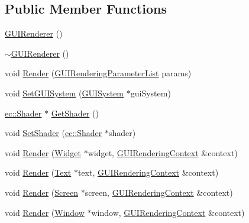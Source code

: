 \subsection*{Public Member Functions}
\begin{DoxyCompactItemize}
\item 
\mbox{\hyperlink{classngl__gui_1_1_g_u_i_renderer_ad3a022f8ea3ad488692223baf808d103}{G\+U\+I\+Renderer}} ()
\item 
\mbox{\hyperlink{classngl__gui_1_1_g_u_i_renderer_a73dd3d294eb6e79e3b874942d4a95b5a}{$\sim$\+G\+U\+I\+Renderer}} ()
\item 
void \mbox{\hyperlink{classngl__gui_1_1_g_u_i_renderer_a616aa4e5bc587896848b2523686824a7}{Render}} (\mbox{\hyperlink{structngl__gui_1_1_g_u_i_rendering_parameter_list}{G\+U\+I\+Rendering\+Parameter\+List}} params)
\item 
void \mbox{\hyperlink{classngl__gui_1_1_g_u_i_renderer_a80a4dfa6dbf0df163b24687aa1eea9f1}{Set\+G\+U\+I\+System}} (\mbox{\hyperlink{classngl__gui_1_1_g_u_i_system}{G\+U\+I\+System}} $\ast$gui\+System)
\item 
\mbox{\hyperlink{classec_1_1_shader}{ec\+::\+Shader}} $\ast$ \mbox{\hyperlink{classngl__gui_1_1_g_u_i_renderer_a7c835ff437f3781674a676aaea4546d6}{Get\+Shader}} ()
\item 
void \mbox{\hyperlink{classngl__gui_1_1_g_u_i_renderer_aa1744c6a938e609a87d55a8efece3993}{Set\+Shader}} (\mbox{\hyperlink{classec_1_1_shader}{ec\+::\+Shader}} $\ast$shader)
\item 
void \mbox{\hyperlink{classngl__gui_1_1_g_u_i_renderer_af149928da5c1cb43fb491823a1b264b8}{Render}} (\mbox{\hyperlink{classngl__gui_1_1_widget}{Widget}} $\ast$widget, \mbox{\hyperlink{classngl__gui_1_1_g_u_i_rendering_context}{G\+U\+I\+Rendering\+Context}} \&context)
\item 
void \mbox{\hyperlink{classngl__gui_1_1_g_u_i_renderer_a4c786cb952ffa1b60e47e67ace0c27db}{Render}} (\mbox{\hyperlink{classngl__gui_1_1_text}{Text}} $\ast$text, \mbox{\hyperlink{classngl__gui_1_1_g_u_i_rendering_context}{G\+U\+I\+Rendering\+Context}} \&context)
\item 
void \mbox{\hyperlink{classngl__gui_1_1_g_u_i_renderer_ae4152d9b062f2bc5910645469b265347}{Render}} (\mbox{\hyperlink{classngl__gui_1_1_screen}{Screen}} $\ast$screen, \mbox{\hyperlink{classngl__gui_1_1_g_u_i_rendering_context}{G\+U\+I\+Rendering\+Context}} \&context)
\item 
void \mbox{\hyperlink{classngl__gui_1_1_g_u_i_renderer_a1bd189925c3324cef53d59168aa75d43}{Render}} (\mbox{\hyperlink{classngl__gui_1_1_window}{Window}} $\ast$window, \mbox{\hyperlink{classngl__gui_1_1_g_u_i_rendering_context}{G\+U\+I\+Rendering\+Context}} \&context)
\end{DoxyCompactItemize}


